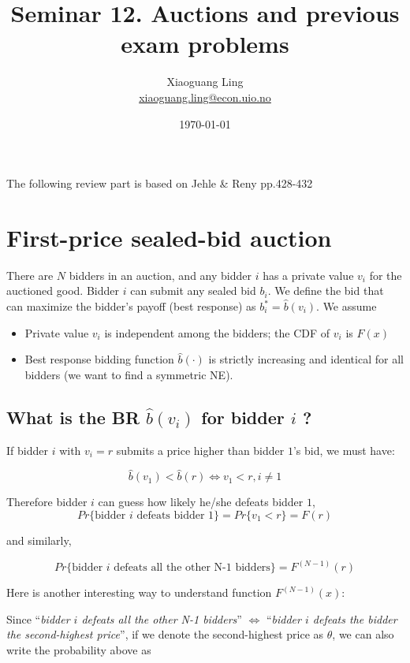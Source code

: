 \documentclass{article}
\title{Seminar 12. Auctions and previous exam problems}
\author{Xiaoguang Ling \\  \href{xiaoguang.ling@econ.uio.no}{xiaoguang.ling@econ.uio.no}}
\date{\today}
\begin{document}
\maketitle

\begin{mdframed}[backgroundcolor=blue!20,linecolor=white]

The following review part is based on Jehle \& Reny pp.428-432 

\section*{First-price sealed-bid auction}

There are $N$ bidders in an auction, and any bidder $i$ has a private value $v_i$ for the auctioned good. Bidder $i$ can submit any sealed bid $b_i$. We define the bid that can maximize the bidder's payoff (best response) as $b_i^* = \hat{b}(v_i)$. We assume
\begin{itemize}
\item Private value $v_i$ is independent among the bidders; the CDF of $v_i$ is $F(x)$
\item Best response bidding function $\hat{b}(\cdot)$ is strictly increasing and identical for all bidders (we want to find a symmetric NE).
\end{itemize}

\subsection*{What is the BR $\hat{b}(v_i)$ for bidder $i$ ?}

If bidder $i$ with $v_i=r$ submits a price higher than bidder $1$'s bid, we must have:

$$\hat{b}(v_1) < \hat{b}(r) \iff v_1  < r, i \neq 1
$$

\medskip

Therefore bidder $i$ can guess how likely he/she defeats bidder $1$, $$Pr\{\text{bidder $i$ defeats bidder 1}\} = Pr\{v_1  < r\} = F(r)$$

and similarly,

$$Pr\{\text{bidder $i$ defeats all the other N-1 bidders}\} = F^{(N-1)}(r)$$


Here is another interesting way to understand function $F^{(N-1)}(x)$:

\smallskip 

Since ``\textit{bidder $i$ defeats all the other N-1 bidders}'' $\iff$ ``\textit{bidder $i$ defeats the bidder the second-highest price}'', if we denote the second-highest price as $\theta$, we can also write the probability above as


\end{mdframed}
\end{document}
